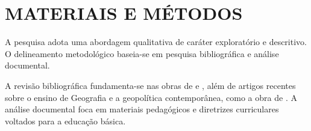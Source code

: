 \chapter{MATERIAIS E MÉTODOS}

A pesquisa adota uma abordagem qualitativa de caráter exploratório e descritivo. O delineamento metodológico baseia-se em pesquisa bibliográfica e análise documental.

A revisão bibliográfica fundamenta-se nas obras de \cite{milton-ne} e \cite{luckesi-avaprend}, além de artigos recentes sobre o ensino de Geografia e a geopolítica contemporânea, como a obra de \cite{Jab-Chn-sec21}. A análise documental foca em materiais pedagógicos e diretrizes curriculares voltados para a educação básica.